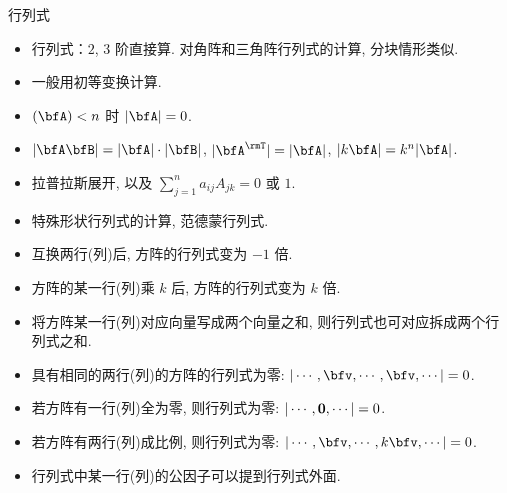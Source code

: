 \documentclass[aspectratio=169,handout]{ctexbeamer}
\let\rank\relax\DeclareMathOperator\rank{\rank}
\begin{document}
\begin{frame}{行列式}
	\onslide<+->
	\begin{itemize}
		\item 行列式：$2$, $3$ 阶直接算. 对角阵和三角阵行列式的计算, 分块情形类似.
		\item 一般用初等变换计算.
		\item $\rank(\bfA)<n$ 时 $|\bfA|=0$.
		\item $|\bfA\bfB|=|\bfA|\cdot|\bfB|$, $|\bfA^\rmT|=|\bfA|$, $|k\bfA|=k^n|\bfA|$.
		\item 拉普拉斯展开, 以及 $\sum_{j=1}^n a_{ij}A_{jk}=0$ 或 $1$.
		\item 特殊形状行列式的计算, 范德蒙行列式.
		\item 互换两行(列)后, 方阵的行列式变为 $-1$ 倍.
		\item 方阵的某一行(列)乘 $k$ 后, 方阵的行列式变为 $k$ 倍.
		\item 将方阵某一行(列)对应向量写成两个向量之和, 则行列式也可对应拆成两个行列式之和.
		\item 具有相同的两行(列)的方阵的行列式为零: $|\cdots,\bfv,\cdots,\bfv,\cdots|=0$.
		\item 若方阵有一行(列)全为零, 则行列式为零: $|\cdots,{\bf0},\cdots|=0$.
		\item 若方阵有两行(列)成比例, 则行列式为零: $|\cdots,\bfv,\cdots,k\bfv,\cdots|=0$.
		\item 行列式中某一行(列)的公因子可以提到行列式外面.
	\end{itemize}
\end{frame}
\end{document}
